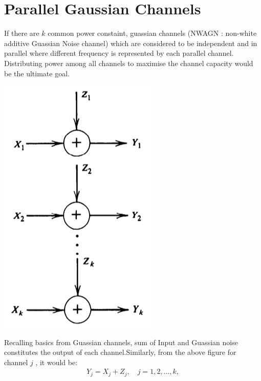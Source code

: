 \section{Parallel Gaussian Channels}
If there are  $k$ common power constaint, guassian channels (NWAGN : non-white additive Guassian Noise channel) which are considered to be independent and in parallel where different frequency is represented by each parallel channel. Distributing power among all channels to maximise the channel capacity would be the ultimate goal.
\\
\begin{center}
	\includegraphics[scale=0.5]{Diagrams/parallel_guassian_channels.png}
\end{center} 
Recalling basics from Guassian channels, sum of Input and Guassian noise constitutes the output of each channel.Similarly, from the above figure for channel $j$ , it would be:
%
\begin{eqnarray}
    Y_j = X_j + Z_j, \quad j = 1, 2, \dots, k,
\end{eqnarray}
%

